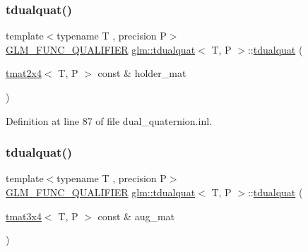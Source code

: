 \mbox{\label{structglm_1_1tdualquat_a7b6503ed3770426be014ac5aa91d954f}} 
\subsubsection{\texorpdfstring{tdualquat()}{tdualquat()}\hspace{0.1cm}{\footnotesize\ttfamily [9/12]}}
{\footnotesize\ttfamily template$<$typename T , precision P$>$ \\
\mbox{\hyperlink{setup_8hpp_a33fdea6f91c5f834105f7415e2a64407}{G\+L\+M\+\_\+\+F\+U\+N\+C\+\_\+\+Q\+U\+A\+L\+I\+F\+I\+ER}} \mbox{\hyperlink{structglm_1_1tdualquat}{glm\+::tdualquat}}$<$ T, P $>$\+::\mbox{\hyperlink{structglm_1_1tdualquat}{tdualquat}} (\begin{DoxyParamCaption}\item[{\mbox{\hyperlink{structglm_1_1tmat2x4}{tmat2x4}}$<$ T, P $>$ const \&}]{holder\+\_\+mat }\end{DoxyParamCaption})}



Definition at line 87 of file dual\+\_\+quaternion.\+inl.

\mbox{\label{structglm_1_1tdualquat_a826805f42bdbf606ce22f393bfd676f3}} 
\subsubsection{\texorpdfstring{tdualquat()}{tdualquat()}\hspace{0.1cm}{\footnotesize\ttfamily [10/12]}}
{\footnotesize\ttfamily template$<$typename T , precision P$>$ \\
\mbox{\hyperlink{setup_8hpp_a33fdea6f91c5f834105f7415e2a64407}{G\+L\+M\+\_\+\+F\+U\+N\+C\+\_\+\+Q\+U\+A\+L\+I\+F\+I\+ER}} \mbox{\hyperlink{structglm_1_1tdualquat}{glm\+::tdualquat}}$<$ T, P $>$\+::\mbox{\hyperlink{structglm_1_1tdualquat}{tdualquat}} (\begin{DoxyParamCaption}\item[{\mbox{\hyperlink{structglm_1_1tmat3x4}{tmat3x4}}$<$ T, P $>$ const \&}]{aug\+\_\+mat }\end{DoxyParamCaption})}



